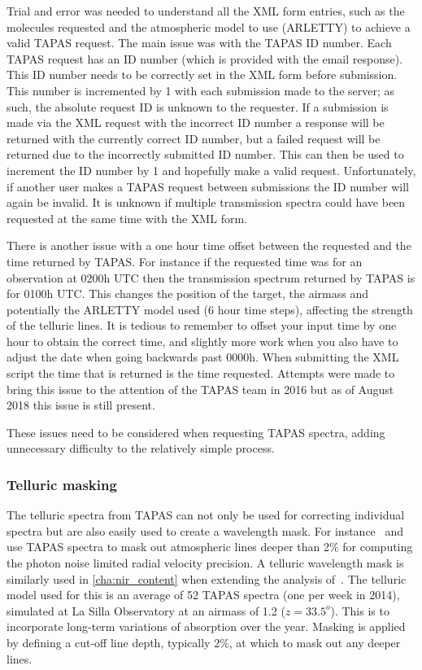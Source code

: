 Trial and error was needed to understand all the {XML} form entries, such as the molecules requested and the atmospheric model to use ({ARLETTY}) to achieve a valid {TAPAS} request.
The main issue was with the {TAPAS} {{ID}} number.
Each {TAPAS} request has an {ID} number (which is provided with the email response).
This {ID} number needs to be correctly set in the {XML} form before submission.
This number is incremented by 1 with each submission made to the server; as such, the absolute request ID is unknown to the requester.
If a submission is made via the {XML} request with the incorrect {ID} number a response will be returned with the currently correct {ID} number, but a failed request will be returned due to the incorrectly submitted ID number.
This can then be used to increment the {ID} number by 1 and hopefully make a valid request.
Unfortunately, if another user makes a {TAPAS} request between submissions the {ID} number will again be invalid.
It is unknown if multiple transmission spectra could have been requested at the same time with the {XML} form.

There is another issue with a one hour time offset between the requested and the time returned by {TAPAS}.
For instance if the requested time was for an observation at 0200h {UTC} then the transmission spectrum returned by {TAPAS} is for 0100h {UTC}.
This changes the position of the target, the airmass and potentially the {ARLETTY} model used (6 hour time steps), affecting the strength of the telluric lines.
It is tedious to remember to offset your input time by one hour to obtain the correct time, and slightly more work when you also have to adjust the date when going backwards past 0000h.
When submitting the {XML} script the time that is returned is the time requested.
Attempts were made to bring this issue to the attention of the {TAPAS} team in 2016 but as of August 2018 this issue is still present.

These issues need to be considered when requesting {TAPAS} spectra, adding unnecessary difficulty to the relatively simple process.

\subsubsection{Telluric masking}
The telluric spectra from {TAPAS} can not only be used for correcting individual spectra but are also easily used to create a wavelength mask.
For instance~\citet{figueira_radial_2016} and~\citet{artigau_optical_2018} use {TAPAS} spectra to mask out atmospheric lines deeper than 2\% for computing the photon noise limited radial velocity precision.
A telluric wavelength mask is similarly used in \cref{cha:nir_content} when extending the analysis of~\citet{figueira_radial_2016}.
The telluric model used for this is an average of 52 {TAPAS} spectra (one per week in 2014), simulated at La Silla Observatory at an airmass of 1.2 (\(z = 33.5^{o}\)).
This is to incorporate long-term variations of absorption over the year.
Masking is applied by defining a cut-off line depth, typically 2\%, at which to mask out any deeper lines.
